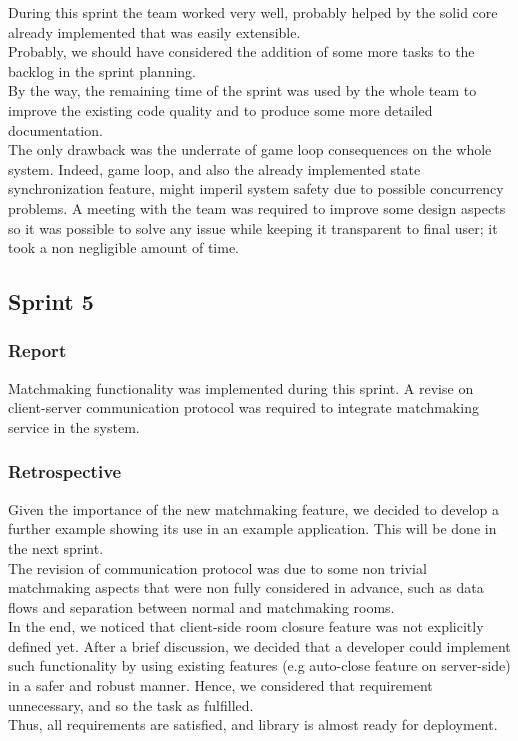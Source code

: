 During this sprint the team worked very well, probably helped by the solid core already implemented that was easily extensible.
\\
Probably, we should have considered the addition of some more tasks to the backlog in the sprint planning.
\\
By the way, the remaining time of the sprint was used by the whole team to improve the existing code quality and to produce some more detailed documentation.
\\
The only drawback was the underrate of game loop consequences on the whole system. Indeed, game loop, and also the already implemented state synchronization feature, might imperil system safety due to possible concurrency problems. A meeting with the team was required to improve some design aspects so it was possible to solve any issue while keeping it transparent to final user; it took a non negligible amount of time.

\subsection{Sprint 5}
\subsubsection{Report}
Matchmaking functionality was implemented during this sprint.
A revise on client-server communication protocol was required to integrate matchmaking service in the system.

\subsubsection{Retrospective}

Given the importance of the new matchmaking feature, we decided to develop a further example showing its use in an example application. This will be done in the next sprint.
\\
The revision of communication protocol was due to some non trivial matchmaking aspects that were non fully considered in advance, such as data flows and separation between normal and matchmaking rooms. 
\\
In the end, we noticed that client-side room closure feature was not explicitly defined yet. 
After a brief discussion, we decided that a developer could implement such functionality by using existing features (e.g auto-close feature on server-side) in a safer and robust manner. Hence, we considered that requirement unnecessary, and so the task as fulfilled.
\\
Thus, all requirements are satisfied, and library is almost ready for deployment.


